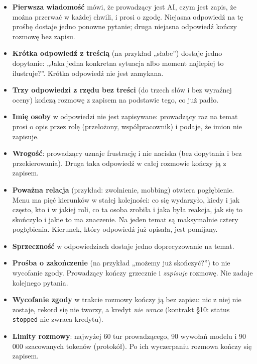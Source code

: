 {\begin{itemize}[leftmargin=*,itemsep=2pt]
  \item \textbf{Pierwsza wiadomość} mówi, że prowadzący jest AI, czym jest zapis,
        że można przerwać w każdej chwili, i prosi o zgodę. Niejasna odpowiedź
        na tę prośbę dostaje jedno ponowne pytanie; druga niejasna odpowiedź
        kończy rozmowę bez zapisu.
  \item \textbf{Krótka odpowiedź z treścią} (na przykład „słabe”) dostaje jedno
        dopytanie: „Jaka jedna konkretna sytuacja albo moment najlepiej to
        ilustruje?”. Krótka odpowiedź nie jest zamykana.
  \item \textbf{Trzy odpowiedzi z rzędu bez treści} (do trzech słów i bez
        wyraźnej oceny) kończą rozmowę z zapisem na podstawie tego, co już padło.
  \item \textbf{Imię osoby} w odpowiedzi nie jest zapisywane: prowadzący raz
        na temat prosi o opis przez rolę (przełożony, współpracownik) i
        podaje, że imion nie zapisuje.
  \item \textbf{Wrogość}: prowadzący uznaje frustrację i nie naciska (bez
        dopytania i bez przekierowania). Druga taka odpowiedź w całej rozmowie
        kończy ją z zapisem.
  \item \textbf{Poważna relacja} (przykład: zwolnienie, mobbing) otwiera
        pogłębienie. Menu ma pięć kierunków w stałej kolejności: co się
        wydarzyło, kiedy i jak często, kto i w jakiej roli, co ta osoba
        zrobiła i jaka była reakcja, jak się to skończyło i jakie to ma
        znaczenie. Na jeden temat są maksymalnie cztery pogłębienia. Kierunek,
        który odpowiedź już opisała, jest pomijany.
  \item \textbf{Sprzeczność} w odpowiedziach dostaje jedno doprecyzowanie na temat.
  \item \textbf{Prośba o zakończenie} (na przykład „możemy już skończyć?”) to
        nie wycofanie zgody. Prowadzący kończy grzecznie i \emph{zapisuje}
        rozmowę. Nie zadaje kolejnego pytania.
  \item \textbf{Wycofanie zgody} w trakcie rozmowy kończy ją bez zapisu: nic
        z niej nie zostaje, rekord się nie tworzy, a kredyt \emph{nie wraca}
        (kontrakt §10: status \texttt{stopped} nie zwraca kredytu).
  \item \textbf{Limity rozmowy}: najwyżej 60 tur prowadzącego, 90 wywołań modelu
        i 90 000 szacowanych tokenów (protokół). Po ich wyczerpaniu rozmowa
        kończy się zapisem.
\end{itemize}

}
